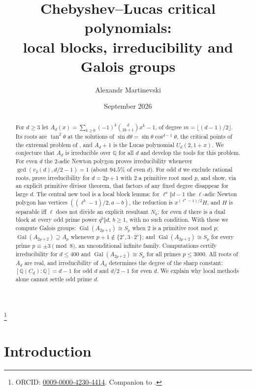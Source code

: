 \documentclass[11pt]{amsart}
\theoremstyle{definition}\newtheorem{definition}[theorem]{Definition}\newtheorem{example}[theorem]{Example}
\theoremstyle{remark}\newtheorem{remark}[theorem]{Remark}
\newcommand{\Q}{\mathbb Q}\newcommand{\Z}{\mathbb Z}\newcommand{\F}{\mathbb F}
\newcommand{\Gal}{\operatorname{Gal}}\newcommand{\disc}{\operatorname{disc}}\newcommand{\Res}{\operatorname{Res}}
\begin{document}
\title[Chebyshev--Lucas critical polynomials]{Chebyshev--Lucas critical polynomials:\\ local blocks, irreducibility and Galois groups}
\author{Alexandr Martinevski}
\address{Independent Researcher, Lithuania}
\thanks{ORCID: \href{https://orcid.org/0009-0000-4230-4414}{0009-0000-4230-4414}. Companion to \cite{I,A}.}
\date{September 2026}
\begin{abstract}
For $d\ge3$ let $A_d(x)=\sum_{k\ge0}(-1)^k\binom d{2k+1}x^k-1$, of degree $m=\lfloor(d-1)/2\rfloor$. Its roots are $\tan^2\theta$ at the solutions of
$\sin d\theta=\sin\theta\cos^{d-1}\theta$, the critical points of the extremal problem of \cite{I}, and $A_d+1$ is the Lucas polynomial $U_d(2,1+x)$.
We conjecture that $A_d$ is irreducible over $\Q$ for all $d$ and develop the tools for this problem. For even $d$ the $2$-adic Newton polygon
proves irreducibility whenever $\gcd(v_2(d),d/2-1)=1$ (about $94.5\%$ of even $d$). For odd $d$ we exclude rational roots, prove irreducibility
for $d=2p+1$ with $2$ a primitive root mod $p$, and show, via an explicit primitive divisor theorem, that factors of any fixed degree
disappear for large $d$. The central new tool is a local block lemma: for $\ell^a\Vert d-1$ the $\ell$-adic Newton polygon has vertices
$((\ell^b-1)/2,a-b)$, the reduction is $x^{(\ell^a-1)/2}H$, and $H$ is separable iff $\ell$ does not divide an explicit resultant $N_k$; for
even $d$ there is a dual block at every odd prime power $q^b\Vert d$, $b\ge1$, with no such condition. With these we compute Galois groups: $\Gal(A_{2p+1})\cong S_p$
when $2$ is a primitive root mod $p$; $\Gal(A_{2p+2})\supseteq A_p$ whenever $p+1\notin\{2^s,3\cdot2^s\}$; and
$\Gal(A_{2p+2})\cong S_p$ for every prime $p\equiv\pm3\pmod8$, an unconditional infinite family. Computations certify irreducibility for $d\le400$ and $\Gal(A_{2p+2})\cong S_p$ for all primes $p\le3000$. All roots of $A_d$ are real, and
irreducibility of $A_d$ determines the degree of the sharp constant: $[\Q(C_d):\Q]=d-1$ for odd $d$ and $d/2-1$ for even $d$. We explain why local methods alone cannot settle odd prime $d$.
\end{abstract}
\maketitle

\section{Introduction}\label{sec:intro}
\end{document}
